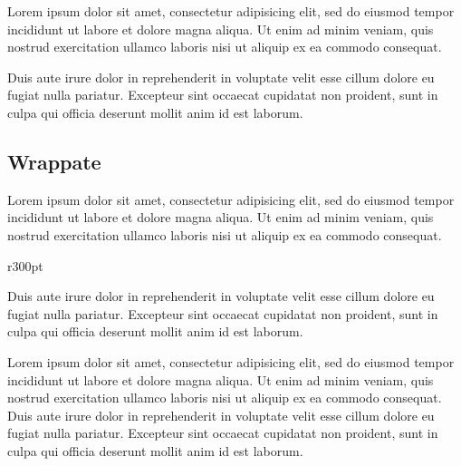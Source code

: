 \documentclass[a4paper, 12pt]{report}
\begin{document}
Lorem ipsum dolor sit amet, consectetur adipisicing elit, sed do eiusmod
tempor incididunt ut labore et dolore magna aliqua. Ut enim ad minim veniam,
quis nostrud exercitation ullamco laboris nisi ut aliquip ex ea commodo consequat.

\begin{figure}[h]
	\centering
\end{figure}

Duis aute irure dolor in reprehenderit in voluptate velit esse
cillum dolore eu fugiat nulla pariatur. Excepteur sint occaecat cupidatat non
proident, sunt in culpa qui officia deserunt mollit anim id est laborum.

\subsection*{Wrappate}

Lorem ipsum dolor sit amet, consectetur adipisicing elit, sed do eiusmod
tempor incididunt ut labore et dolore magna aliqua. Ut enim ad minim veniam,
quis nostrud exercitation ullamco laboris nisi ut aliquip ex ea commodo consequat.

\begin{wrapfigure}{r}{300pt}
	\centering
	\vspace{-1.5\baselineskip}
	\vspace{-2.5\baselineskip}
\end{wrapfigure}

Duis aute irure dolor in reprehenderit in voluptate velit esse
cillum dolore eu fugiat nulla pariatur. Excepteur sint occaecat cupidatat non
proident, sunt in culpa qui officia deserunt mollit anim id est laborum.

Lorem ipsum dolor sit amet, consectetur adipisicing elit, sed do eiusmod
tempor incididunt ut labore et dolore magna aliqua. Ut enim ad minim veniam,
quis nostrud exercitation ullamco laboris nisi ut aliquip ex ea commodo
consequat. Duis aute irure dolor in reprehenderit in voluptate velit esse
cillum dolore eu fugiat nulla pariatur. Excepteur sint occaecat cupidatat non
proident, sunt in culpa qui officia deserunt mollit anim id est laborum.
\end{document}
